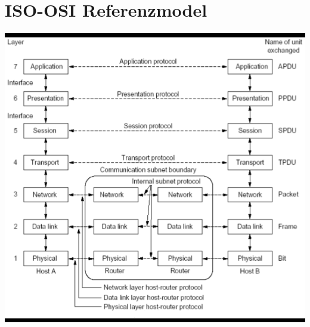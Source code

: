 \documentclass[11pt]{article}
\begin{document}
\section{ISO-OSI Referenzmodel}
    \includegraphics[width=\textwidth]{ISO_OSIReferenceModel.png}
\end{document}
